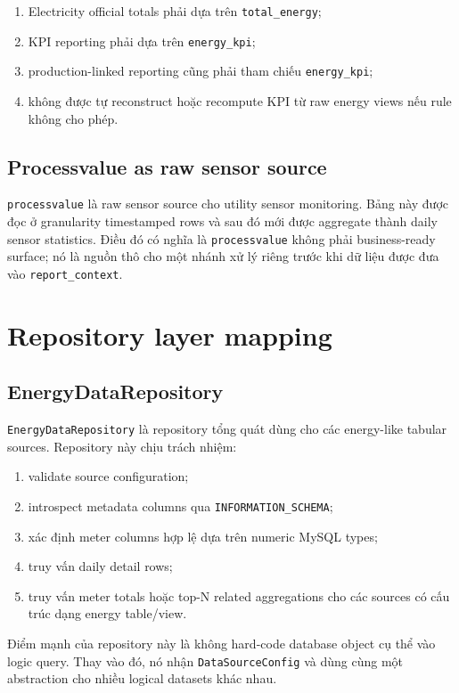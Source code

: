 \begin{enumerate}[label=-]
\item Electricity official totals phải dựa trên \texttt{total\_energy};
\item KPI reporting phải dựa trên \texttt{energy\_kpi};
\item production-linked reporting cũng phải tham chiếu \texttt{energy\_kpi};
\item không được tự reconstruct hoặc recompute KPI từ raw energy views nếu rule không cho phép.
\end{enumerate}

\subsection{Processvalue as raw sensor source}

\texttt{processvalue} là raw sensor source cho utility sensor monitoring. Bảng này được đọc ở granularity timestamped rows và sau đó mới được aggregate thành daily sensor statistics. Điều đó có nghĩa là \texttt{processvalue} không phải business-ready surface; nó là nguồn thô cho một nhánh xử lý riêng trước khi dữ liệu được đưa vào \texttt{report\_context}.

\section{Repository layer mapping}

\subsection{EnergyDataRepository}

\texttt{EnergyDataRepository} là repository tổng quát dùng cho các energy-like tabular sources. Repository này chịu trách nhiệm:

\begin{enumerate}[label=-]
\item validate source configuration;
\item introspect metadata columns qua \texttt{INFORMATION\_SCHEMA};
\item xác định meter columns hợp lệ dựa trên numeric MySQL types;
\item truy vấn daily detail rows;
\item truy vấn meter totals hoặc top-N related aggregations cho các sources có cấu trúc dạng energy table/view.
\end{enumerate}

Điểm mạnh của repository này là không hard-code database object cụ thể vào logic query. Thay vào đó, nó nhận \texttt{DataSourceConfig} và dùng cùng một abstraction cho nhiều logical datasets khác nhau.

